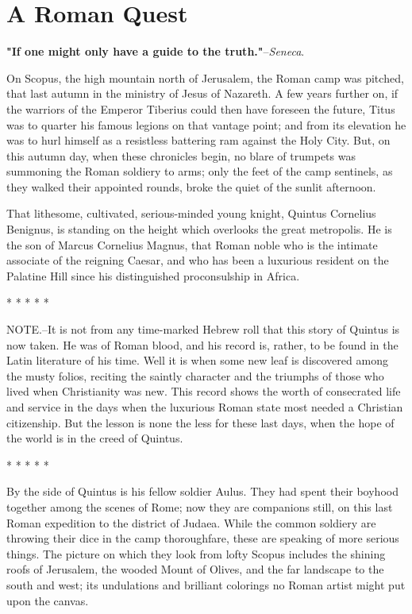 \chapter*{A Roman Quest}
\textbf{"If one might only have a guide to the truth."}--\textit{Seneca}.


On Scopus, the high mountain north of Jerusalem, the Roman camp was
pitched, that last autumn in the ministry of Jesus of Nazareth.  A
few years further on, if the warriors of the Emperor Tiberius could
then have foreseen the future, Titus was to quarter his famous
legions on that vantage point; and from its elevation he was to
hurl himself as a resistless battering ram against the Holy City.
But, on this autumn day, when these chronicles begin, no blare of
trumpets was summoning the Roman soldiery to arms; only the feet of
the camp sentinels, as they walked their appointed rounds, broke
the quiet of the sunlit afternoon.

That lithesome, cultivated, serious-minded young knight, Quintus
Cornelius Benignus, is standing on the height which overlooks the
great metropolis.  He is the son of Marcus Cornelius Magnus, that
Roman noble who is the intimate associate of the reigning Caesar,
and who has been a luxurious resident on the Palatine Hill since
his distinguished proconsulship in Africa.

     *     *     *     *     *

NOTE.--It is not from any time-marked Hebrew roll that this story
of Quintus is now taken.  He was of Roman blood, and his record is,
rather, to be found in the Latin literature of his time.  Well it
is when some new leaf is discovered among the musty folios,
reciting the saintly character and the triumphs of those who lived
when Christianity was new.  This record shows the worth of
consecrated life and service in the days when the luxurious Roman
state most needed a Christian citizenship.  But the lesson is none
the less for these last days, when the hope of the world is in the
creed of Quintus.

     *     *     *     *     *

By the side of Quintus is his fellow soldier Aulus.  They had spent
their boyhood together among the scenes of Rome; now they are
companions still, on this last Roman expedition to the district of
Judaea.  While the common soldiery are throwing their  dice  in
the  camp thoroughfare, these are speaking of more serious things.
The picture on which they look from lofty Scopus includes the
shining roofs of Jerusalem, the wooded Mount of Olives, and the far
landscape to the south and west; its undulations and brilliant
colorings no Roman artist might put upon the canvas.

